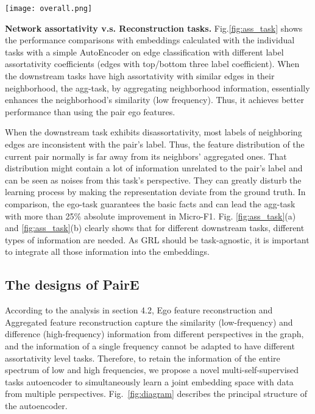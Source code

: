 \documentclass[10pt,journal,compsoc]{IEEEtran}
\begin{document}
\begin{figure*}[ht]
\centering
\texttt{[image: overall.png]}
\caption{A conceptual diagram for multi-self-supervised tasks autoencoder}
\label{fig:diagram}
\end{figure*}

\noindent\textbf{Network assortativity v.s. Reconstruction tasks.} Fig.\ref{fig:ass_task} shows the performance comparisons with embeddings calculated with the individual tasks with a simple AutoEncoder on edge classification with different label assortativity coefficients (edges with top/bottom three label coefficient). When the downstream tasks have high assortativity with similar edges in their neighborhood, the agg-task, by aggregating neighborhood information, essentially enhances the neighborhood's similarity (low frequency). Thus, it achieves better performance than using the pair ego features. 


When the downstream task exhibits disassortativity, most labels of neighboring edges are inconsistent with the pair's label. Thus, the feature distribution of the current pair normally is far away from its neighbors' aggregated ones. That distribution might contain a lot of information unrelated to the pair's label and can be seen as noises from this task's perspective. They can greatly disturb the learning process by making the representation deviate from the ground truth. In comparison, the ego-task guarantees the basic facts and can lead the agg-task with more than 25\% absolute improvement in Micro-F1. Fig. \ref{fig:ass_task}(a) and \ref{fig:ass_task}(b) clearly shows that for different downstream tasks, different types of information are needed. As GRL should be task-agnostic, it is important to integrate all those information into the embeddings. 


\subsection{The designs of PairE}

    
According to the analysis in section 4.2, Ego feature reconstruction and Aggregated feature reconstruction capture the similarity (low-frequency) and difference (high-frequency) information from different perspectives in the graph, and the information of a single frequency cannot be adapted to have different assortativity level tasks. Therefore, to retain the information of the entire spectrum of low and high frequencies, we propose a novel multi-self-supervised tasks autoencoder to simultaneously learn a joint embedding space with data from multiple perspectives. Fig.~\ref{fig:diagram} describes the principal structure of the autoencoder. 
 
\end{document}
